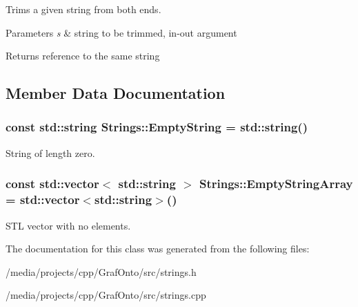 \-Trims a given string from both ends. 


\begin{DoxyParams}{\-Parameters}
{\em s} & string to be trimmed, in-\/out argument \\
\hline
\end{DoxyParams}
\begin{DoxyReturn}{\-Returns}
reference to the same string 
\end{DoxyReturn}


\subsection{\-Member \-Data \-Documentation}
\hypertarget{class_strings_a9069eb99db3a03a96acb5824d306ff53}{
\subsubsection[{\-Empty\-String}]{\setlength{\rightskip}{0pt plus 5cm}const std\-::string {\bf \-Strings\-::\-Empty\-String} = std\-::string()}}\label{class_strings_a9069eb99db3a03a96acb5824d306ff53}
\-String of length zero. \hypertarget{class_strings_a955ff72272619b3edbd2458c0371f98f}{
\subsubsection[{\-Empty\-String\-Array}]{\setlength{\rightskip}{0pt plus 5cm}const std\-::vector$<$ std\-::string $>$ {\bf \-Strings\-::\-Empty\-String\-Array} = std\-::vector$<$std\-::string$>$()}}\label{class_strings_a955ff72272619b3edbd2458c0371f98f}
\-S\-T\-L vector with no elements. 

\-The documentation for this class was generated from the following files\-:\begin{DoxyCompactItemize}
\item 
/media/projects/cpp/\-Graf\-Onto/src/strings.\-h\item 
/media/projects/cpp/\-Graf\-Onto/src/strings.\-cpp\end{DoxyCompactItemize}
